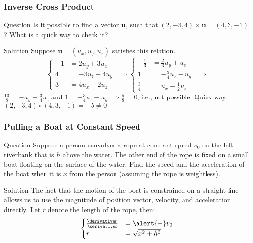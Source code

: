 \begin{frame}
\frametitle{Inverse Cross Product}
\begin{block}{Question}
Is it \alert{possible} to find a vector $\mathbf{u}$, such that $(2,-3,4)\times\mathbf{u}=(4,3,-1)$? What is a quick way to check it?
\end{block}
\begin{block}{Solution}
Suppose $\mathbf{u}=(u_x,u_y,u_z)$ satisfies this relation.
\[\begin{cases}-1&=2u_y+3u_x\\4&=-3u_z-4u_y\\3&=4u_x-2u_z\end{cases}\implies\begin{cases}-\frac{1}{3}&=\frac{2}{3}u_y+u_x\\1&=-\frac{3}{4}u_z-u_y\\\frac{3}{4}&=u_x-\frac{1}{2}u_z\end{cases}\implies\]$\frac{13}{8}=-u_y-\frac{3}{4}u_z$ and $1=-\frac{3}{4}u_z-u_y\implies \frac{5}{8}=0$, i.e., not possible. \alert{Quick way:} $(2,-3,4)\circ (4,3,-1)=-5\neq 0$
\end{block}
\end{frame}
\begin{frame}
\frametitle{Pulling a Boat at Constant Speed}
\begin{block}{Question}
Suppose a person convolves a rope at \alert{constant speed $v_0$} on the left riverbank that is \alert{$h$} above the water. The other end of the rope is \alert{fixed} on a small boat floating on the surface of the water. Find the speed and the acceleration of the boat when it is \alert{$x$ from the person} (assuming the rope is weightless).
\end{block}
\begin{block}{Solution}
The fact that the motion of the boat is constrained on a straight line allows us to use the \alert{magnitude} of \alert{position vector}, \alert{velocity}, and \alert{acceleration} directly.
Let $r$ denote the \alert{length} of the rope, then:
\[
\begin{cases}
\frac{\derivative r}{\derivative t}&=\alert{-}v_0\\
r&=\sqrt{x^{2}+h^{2}}
\end{cases}
\]
\end{block}
\end{frame}
